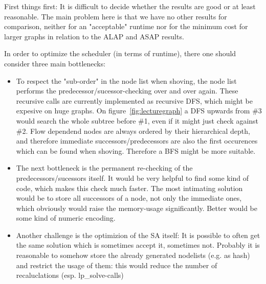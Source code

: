 First things first: It is difficult to decide whether the results are good or at least reasonable. The main problem here is that we have no other results for comparison, neither for an "acceptable" runtime nor for the minimum cost for larger graphs in relation to the ALAP and ASAP results.

In order to optimize the scheduler (in terms of runtime), there one should consider three main bottlenecks:
\begin{itemize}
	\item{To respect the "sub-order" in the node list when shoving, the node list performs the predecessor/sucessor-checking over and over again. These recursive calls are currently implemented as recursive DFS, which might be expesive on huge graphs. On figure~\ref{fig:lecturegraph} a DFS upwards from \#3 would search the whole subtree before \#1, even if it might just check against \#2. Flow dependend nodes are always ordered by their hierarchical depth, and therefore immediate successors/predecessors are also the first occurences which can be found when shoving. Therefore a BFS might be more suitable.}
	\item{The next bottleneck is the permanent re-checking of the predecessors/sucessors itself. It would be very helpful to find some kind of code, which makes this check much faster. The most intimating solution would be to store all successors of a node, not only the immediate ones, which obviously would raise the memory-usage significantly. Better would be some kind of numeric encoding.}
	\item{Another challenge is the optimizion of the SA itself: It is possible to often get the same solution which is sometimes accept it, sometimes not. Probably it is reasonable to somehow store the already generated nodelists (e.g. as hash) and restrict the usage of them: this would reduce the number of recaluclations (esp. lp_solve-calls)}
\end{itemize}

